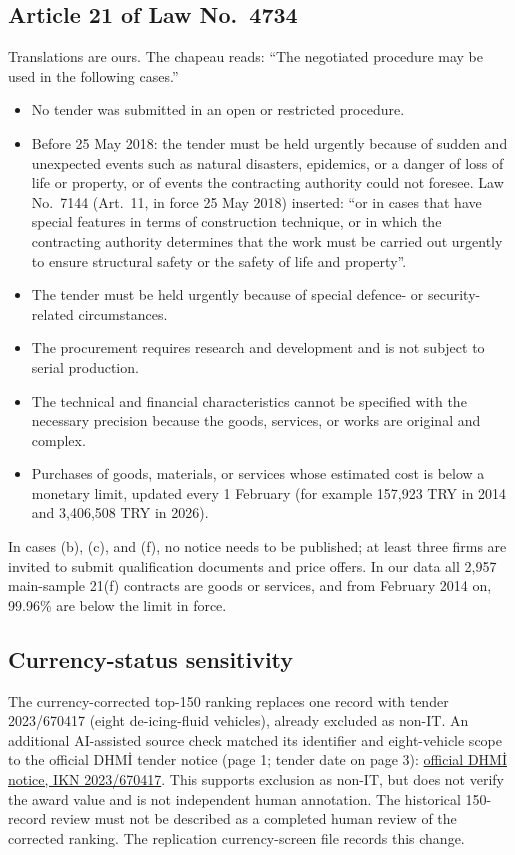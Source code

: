 \documentclass[11pt,a4paper]{article}
\begin{document}
\subsection{Article 21 of Law No.~4734}
Translations are ours. The chapeau reads: ``The negotiated procedure may be used in the following cases.''
\begin{itemize}
\item[(a)] No tender was submitted in an open or restricted procedure.
\item[(b)] Before 25 May 2018: the tender must be held urgently because of sudden and unexpected events such as natural disasters, epidemics, or a danger of loss of life or property, or of events the contracting authority could not foresee. Law No.~7144 (Art.~11, in force 25 May 2018) inserted: ``or in cases that have special features in terms of construction technique, or in which the contracting authority determines that the work must be carried out urgently to ensure structural safety or the safety of life and property''.
\item[(c)] The tender must be held urgently because of special defence- or security-related circumstances.
\item[(d)] The procurement requires research and development and is not subject to serial production.
\item[(e)] The technical and financial characteristics cannot be specified with the necessary precision because the goods, services, or works are original and complex.
\item[(f)] Purchases of goods, materials, or services whose estimated cost is below a monetary limit, updated every 1 February (for example 157,923 TRY in 2014 and 3,406,508 TRY in 2026).
\end{itemize}
In cases (b), (c), and (f), no notice needs to be published; at least three firms are invited to submit qualification documents and price offers. In our data all 2,957 main-sample 21(f) contracts are goods or services, and from February 2014 on, 99.96\% are below the limit in force.

\subsection{Currency-status sensitivity}
The currency-corrected top-150 ranking replaces one record with tender 2023/670417 (eight de-icing-fluid vehicles), already excluded as non-IT. An additional AI-assisted source check matched its identifier and eight-vehicle scope to the official DHMİ tender notice (page 1; tender date on page 3): \href{https://www.dhmi.gov.tr/Lists/IhaleIlanlari/Attachments/1455/ihale\%20ilan\%C4\%B1-de.\%C4\%B1c\%C4\%B1ng.pdf}{official DHMİ notice, IKN 2023/670417}. This supports exclusion as non-IT, but does not verify the award value and is not independent human annotation. The historical 150-record review must not be described as a completed human review of the corrected ranking. The replication currency-screen file records this change.
\end{document}
